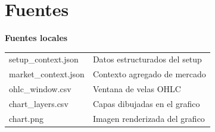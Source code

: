 \documentclass[11pt,a4paper]{article}
\begin{document}
\section*{Fuentes}
\textbf{Fuentes locales}\par
\begin{tabularx}{\textwidth}{p{4.2cm}X}
setup\_context.json & Datos estructurados del setup \\
market\_context.json & Contexto agregado de mercado \\
ohlc\_window.csv & Ventana de velas OHLC \\
chart\_layers.csv & Capas dibujadas en el grafico \\
chart.png & Imagen renderizada del grafico \\
\end{tabularx}
\end{document}
